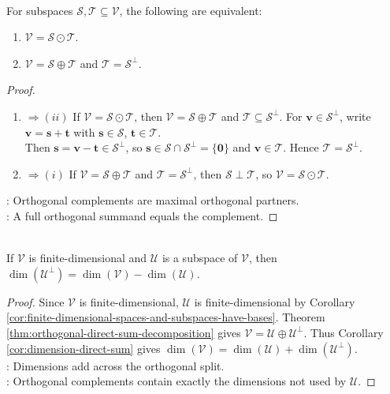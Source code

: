 \begin{proposition} \label{prop:orthogonal-direct-sum-characterization} \\
For subspaces $\mathcal{S},\mathcal{T}\subseteq\mathcal{V}$, the following are equivalent:
\begin{enumerate}[label=\roman*.]
\setlength{\itemsep}{0pt}
\item $\mathcal{V}=\mathcal{S}\odot\mathcal{T}$.
\item $\mathcal{V}=\mathcal{S}\oplus\mathcal{T}$ and $\mathcal{T}=\mathcal{S}^{\perp}$.
\end{enumerate}
\begin{proof}
\begin{enumerate}[label=(\roman*).]
\setlength{\itemsep}{0pt}
\item[$(i)$]$\Rightarrow (ii)$ If $\mathcal{V}=\mathcal{S}\odot\mathcal{T}$, then $\mathcal{V}=\mathcal{S}\oplus\mathcal{T}$ and $\mathcal{T}\subseteq\mathcal{S}^{\perp}$. For $\mathbf{v}\in\mathcal{S}^{\perp}$, write $\mathbf{v}=\mathbf{s}+\mathbf{t}$ with $\mathbf{s}\in\mathcal{S}$, $\mathbf{t}\in\mathcal{T}$.\\
Then $\mathbf{s}=\mathbf{v}-\mathbf{t}\in\mathcal{S}^{\perp}$, so $\mathbf{s}\in\mathcal{S}\cap\mathcal{S}^{\perp}=\{\mathbf{0}\}$ and $\mathbf{v}\in\mathcal{T}$. Hence $\mathcal{T}=\mathcal{S}^{\perp}$.
\item[$(ii)$]$\Rightarrow (i)$ If $\mathcal{V}=\mathcal{S}\oplus\mathcal{T}$ and $\mathcal{T}=\mathcal{S}^{\perp}$, then $\mathcal{S}\perp\mathcal{T}$, so $\mathcal{V}=\mathcal{S}\odot\mathcal{T}$.
\end{enumerate}
: Orthogonal complements are maximal orthogonal partners.\\
: A full orthogonal summand equals the complement.
\end{proof}
\end{proposition}

\begin{corollary} \label{cor:dimension-of-orthogonal-complement} \\
If $\mathcal{V}$ is finite-dimensional and $\mathcal{U}$ is a subspace of $\mathcal{V}$, then $\dim(\mathcal{U}^{\perp})=\dim(\mathcal{V})-\dim(\mathcal{U})$.
\begin{proof}
Since $\mathcal{V}$ is finite-dimensional, $\mathcal{U}$ is finite-dimensional by Corollary \ref{cor:finite-dimensional-spaces-and-subspaces-have-bases}. Theorem \ref{thm:orthogonal-direct-sum-decomposition} gives $\mathcal{V}=\mathcal{U}\oplus\mathcal{U}^{\perp}$. Thus Corollary \ref{cor:dimension-direct-sum} gives $\dim(\mathcal{V})=\dim(\mathcal{U})+\dim(\mathcal{U}^{\perp})$.\\
: Dimensions add across the orthogonal split.\\
: Orthogonal complements contain exactly the dimensions not used by $\mathcal{U}$.
\end{proof}
\end{corollary}

